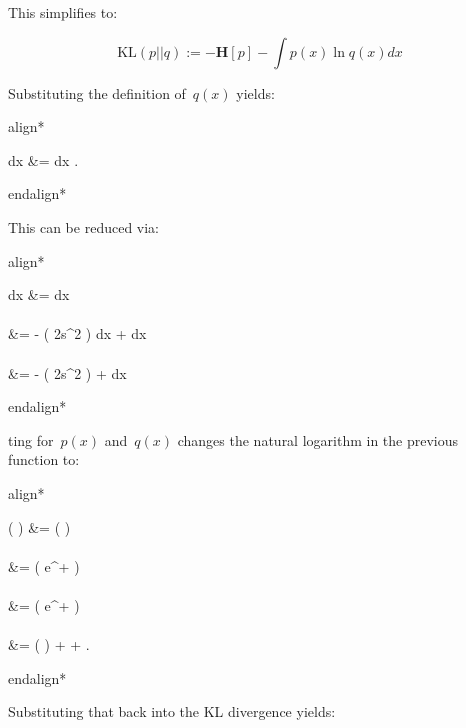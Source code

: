\documentclass{report}
\newenvironment{aligncustom}
{ \csname align*\endcsname %
    \centering
}
{
  \csname endalign*\endcsname
}
\begin{document}
  This simplifies to:
  
  \[\textrm{KL}(p||q) := -\mathbf{H}[p] - \int {p(x) \ln q(x)} dx \]
  
  Substituting the definition of~$q(x)$ yields:
  
  \begin{aligncustom}
     dx &=  dx \textrm{.}
  \end{aligncustom}

  This can be reduced via:
  
  \begin{aligncustom}
     dx  &=  dx \\~\\
    &= - \ln \left( 2\pi s^2 \right)  dx +  dx \\~\\
    &= - \ln \left( 2\pi s^2 \right) +  dx 
  \end{aligncustom}

ting for~$p(x)$ and~$q(x)$ changes the natural logarithm in the previous function to:
  
  \begin{aligncustom}
    \ln \left(  \right) &= \ln \left(    \right) \\~\\
    &= \ln \left(   e^{+} \right) \\~\\
    &= \ln \left(   e^{+} \right)\\~\\
    &= \ln \left(   \right) + + \textrm{.}
  \end{aligncustom}
  
  Substituting that back into the KL divergence yields:
  
\end{document}
